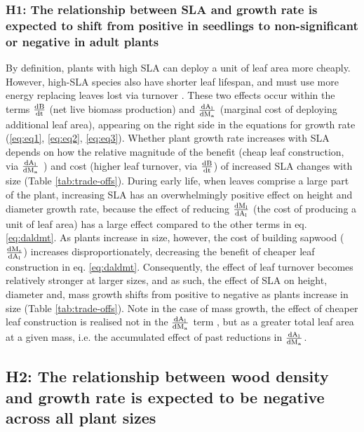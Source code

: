 \documentclass[a4paper,11pt]{article}
\begin{document}
\subsubsection*{H1: The relationship between SLA and growth rate is expected to shift from positive in seedlings to non-significant or negative in adult plants}

By definition, plants with high SLA can deploy a unit of leaf area more cheaply. However, high-SLA species also have shorter leaf lifespan, and must use more energy replacing leaves lost via turnover \citep{Wright:2004jb}. These two effects occur within the terms  $\frac{\rm{d} B}{\rm{d} t}$ (net live biomass production) and $\frac{\rm{d} A_{\rm l}}{\rm{d} M_{\rm a} }$ (marginal cost of deploying additional leaf area), appearing on the right side in the equations for growth rate (\ref{eq:eq1}, \ref{eq:eq2}, \ref{eq:eq3}). Whether plant growth rate increases with SLA depends on how the relative magnitude of the benefit (cheap leaf construction, via $\frac{\rm{d} A_{\rm l}}{\rm{d} M_{\rm a} }$ ) and cost (higher leaf turnover, via $\frac{\rm{d} B}{\rm{d} t}$) of increased SLA changes with size (Table \ref{tab:trade-offs}).
During early life, when leaves comprise a large part of the plant, increasing SLA has an overwhelmingly positive effect on height and diameter growth rate, because the effect of reducing $\frac{\rm{d} M_{\rm l}}{\rm{d} A_{\rm l}}$ (the cost of producing a unit of leaf area) has a large effect compared to the other terms in eq. \ref{eq:daldmt}. As plants increase in size, however, the cost of building sapwood ($\frac{\rm{d} M_{\rm s}}{\rm{d} A_{\rm l}}$) increases disproportionately, decreasing the benefit of cheaper leaf construction in eq.  \ref{eq:daldmt}. Consequently, the effect of leaf turnover becomes relatively stronger at larger sizes, and as such, the effect of SLA on height, diameter and, mass growth shifts from positive to negative as plants increase in size (Table \ref{tab:trade-offs}). Note in the case of mass growth, the effect of cheaper leaf construction is realised not in the $\frac{\rm{d} A_{\rm l}}{\rm{d} M_{\rm a} }$ term , but as a greater total leaf area at a given mass, i.e. the accumulated effect of past reductions in  $\frac{\rm{d} A_{\rm l}}{\rm{d} M_{\rm a} }$.

\subsection*{H2: The relationship between wood density and growth rate is expected to be negative across all plant sizes}
\end{document}
